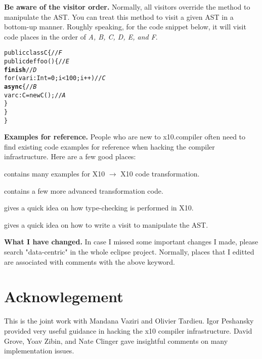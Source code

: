 \documentclass{article}
\begin{document}
\begin{enumerate}
\Item \textbf{Be aware of the visitor order.} Normally, all visitors override the  method to manipulate the AST. You can treat this method to visit a given AST in a bottom-up manner.  Roughly speaking, for the code snippet below, it will visit code places in the order of \textit{A, B, C,  D, E, and F}.

\begin{CodeOut}
\begin{alltt}
public class C \{                          //\textit{F}
    public def foo() \{                      //\textit{E}
        \textbf{finish}                                //\textit{D}
            for (var i:Int = 0; i < 100; i++)   //\textit{C}
                \textbf{async} \{                          //\textit{B}
                      var c:C = new C();           //\textit{A}
                \}
    \}
\}
\end{alltt}
\end{CodeOut}

\Item \textbf{Examples for reference.} People who are new to x10.compiler often need to find existing code examples for reference when hacking the compiler infrastructure. Here are a few good places:

\begin{itemize}

\Item {} contains many examples for X10 $\rightarrow$ X10 code transformation.

\Item {} contains a few more advanced transformation code.

\Item {} gives a quick idea on how type-checking is performed in X10.

\Item {} gives a quick idea on how to write a visit to manipulate the AST.

\end{itemize}

\Item \textbf{What I have changed.} In case I missed some important changes I made, please search "data-centric" in the whole eclipse project. Normally, places that I editted  are associated with comments with the above keyword.

\end{enumerate}


\section{Acknowlegement}

This is the joint work with Mandana Vaziri and Olivier Tardieu. Igor Peshansky provided very useful guidance in hacking the x10 compiler infrastructure. David Grove, Yoav Zibin, and Nate Clinger gave insightful comments on many implementation issues.
\end{document}
